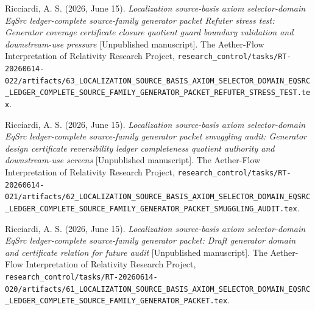 \documentclass[11pt]{article}
\begin{document}
Ricciardi, A. S. (2026, June 15). \emph{Localization source-basis axiom
selector-domain EqSrc ledger-complete source-family generator packet
Refuter stress test: Generator coverage certificate closure quotient
guard boundary validation and downstream-use pressure} [Unpublished
manuscript]. The Aether-Flow Interpretation of Relativity Research
Project,
\texttt{research\_control/tasks/RT-20260614-022/artifacts/63\_LOCALIZATION\_SOURCE\_BASIS\_AXIOM\_SELECTOR\_DOMAIN\_EQSRC\_LEDGER\_COMPLETE\_SOURCE\_FAMILY\_GENERATOR\_PACKET\_REFUTER\_STRESS\_TEST.tex}.

Ricciardi, A. S. (2026, June 15). \emph{Localization source-basis axiom
selector-domain EqSrc ledger-complete source-family generator packet
smuggling audit: Generator design certificate reversibility ledger
completeness quotient authority and downstream-use screens}
[Unpublished manuscript]. The Aether-Flow Interpretation of Relativity
Research Project,
\texttt{research\_control/tasks/RT-20260614-021/artifacts/62\_LOCALIZATION\_SOURCE\_BASIS\_AXIOM\_SELECTOR\_DOMAIN\_EQSRC\_LEDGER\_COMPLETE\_SOURCE\_FAMILY\_GENERATOR\_PACKET\_SMUGGLING\_AUDIT.tex}.

Ricciardi, A. S. (2026, June 15). \emph{Localization source-basis axiom
selector-domain EqSrc ledger-complete source-family generator packet:
Draft generator domain and certificate relation for future audit}
[Unpublished manuscript]. The Aether-Flow Interpretation of Relativity
Research Project,
\texttt{research\_control/tasks/RT-20260614-020/artifacts/61\_LOCALIZATION\_SOURCE\_BASIS\_AXIOM\_SELECTOR\_DOMAIN\_EQSRC\_LEDGER\_COMPLETE\_SOURCE\_FAMILY\_GENERATOR\_PACKET.tex}.
\end{document}
